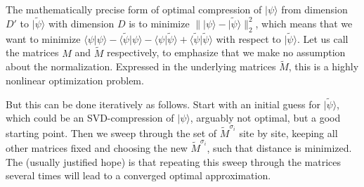 \documentclass[a4paper,10pt,oneside,onecolumn,1p,times]{elsarticle}
\newcommand{\ket}[1]{\mbox{$| #1  \rangle$}}
\newcommand{\braket}[2]{\mbox{$\langle #1  | #2 \rangle$}} 	%
\begin{document}
The mathematically precise form of optimal compression of $\ket{\psi}$ from dimension $D'$ to $\ket{\tilde{\psi}}$ with dimension $D$ is to minimize $\| \ket{\psi} - \ket{\tilde{\psi}} \|_2^2$, which means that we want to minimize $\braket{\psi}{\psi} - \braket{\tilde{\psi}}{\psi} -\braket{\psi}{\tilde{\psi}} + \braket{\tilde{\psi}}{\tilde{\psi}}$ with respect to $\ket{\tilde{\psi}}$. Let us call the matrices $M$ and $\tilde{M}$ respectively, to emphasize that we make no assumption about the normalization. Expressed in the underlying matrices $\tilde{M}$, this is a highly nonlinear optimization problem.

But this can be done iteratively as follows. Start with an initial guess for $\ket{\tilde{\psi}}$, which could be an SVD-compression of $\ket{\psi}$, arguably not optimal, but a good starting point. Then we sweep through the set of $\tilde{M}^{\sigma_i}$ site by site, keeping all other matrices fixed and choosing the new $\tilde{M}^{\sigma_i}$, such that distance is minimized. The (usually justified hope) is that repeating this sweep through the matrices several times will lead to a converged optimal approximation.
\end{document}
